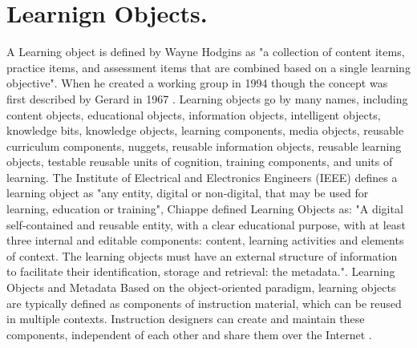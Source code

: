 \section{Learnign Objects.}
A Learning object is defined by Wayne Hodgins \cite{wayneh} as "a collection of content items, practice items, and assessment items that are combined based on a single learning objective". When he created a working group in 1994 though the concept was first described by Gerard in 1967 \cite{gerard1967}. Learning objects go by many names, including content objects, educational objects, information objects, intelligent objects, knowledge bits, knowledge objects, learning components, media objects, reusable curriculum components, nuggets, reusable information objects, reusable learning objects, testable reusable units of cognition, training components, and units of learning. The Institute of Electrical and Electronics Engineers (IEEE) \cite{ieee} defines a learning object as "any entity, digital or non-digital, that may be used for learning, education or training", Chiappe \cite{ChiappeLaverde2007} defined Learning Objects as: "A digital self-contained and reusable entity, with a clear educational purpose, with at least three internal and editable components: content, learning activities and elements of context. The learning objects must have an external structure of information to facilitate their identification, storage and retrieval: the metadata.".
 Learning Objects and Metadata Based on the object-oriented paradigm, learning objects are typically defined as components of instruction material, which can be reused in multiple contexts. Instruction designers can create and maintain these components, independent of each other and share them over the Internet \cite{Dattolo2000}. 

